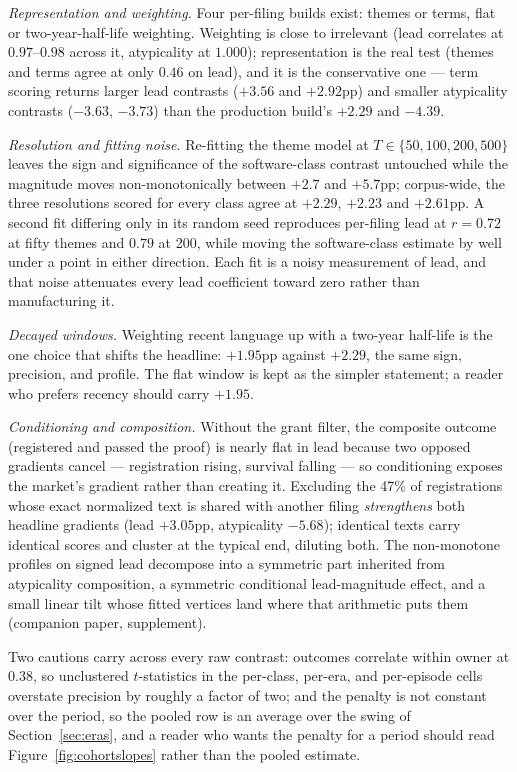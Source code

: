 \emph{Representation and weighting.} Four per-filing builds exist: themes
or terms, flat or two-year-half-life weighting. Weighting is close to
irrelevant (lead correlates at $0.97$--$0.98$ across it, atypicality at
$1.000$); representation is the real test (themes and terms agree at only
$0.46$ on lead), and it is the conservative one --- term scoring returns
larger lead contrasts ($+3.56$ and $+2.92$pp) and smaller atypicality
contrasts ($-3.63$, $-3.73$) than the production build's $+2.29$ and
$-4.39$.

\emph{Resolution and fitting noise.} Re-fitting the theme model at
$T \in \{50, 100, 200, 500\}$ leaves the sign and significance of the
software-class contrast untouched while the magnitude moves
non-monotonically between $+2.7$ and $+5.7$pp; corpus-wide, the three
resolutions scored for every class agree at $+2.29$, $+2.23$ and
$+2.61$pp. A second fit differing only in its random seed reproduces
per-filing lead at $r = 0.72$ at fifty themes and $0.79$ at 200, while
moving the software-class estimate by well under a point in either
direction. Each fit is a noisy measurement of lead, and that noise
attenuates every lead coefficient toward zero rather than manufacturing
it.

\emph{Decayed windows.} Weighting recent language up with a two-year
half-life is the one choice that shifts the headline: $+1.95$pp against
$+2.29$, the same sign, precision, and profile. The flat window is kept
as the simpler statement; a reader who prefers recency should carry
$+1.95$.

\emph{Conditioning and composition.}\label{sec:robust_uncond} Without the
grant filter, the composite outcome (registered and passed the proof) is
nearly flat in lead because two opposed gradients cancel --- registration
rising, survival falling --- so conditioning exposes the market's
gradient rather than creating it. Excluding the 47\% of registrations
whose exact normalized text is shared with another filing
\emph{strengthens} both headline gradients (lead $+3.05$pp, atypicality
$-5.68$); identical texts carry identical scores and cluster at the
typical end, diluting both. The non-monotone profiles on signed lead
decompose into a symmetric part inherited from atypicality composition, a
symmetric conditional lead-magnitude effect, and a small linear tilt
whose fitted vertices land where that arithmetic puts them (companion
paper, supplement).

Two cautions carry across every raw contrast: outcomes correlate within
owner at $0.38$, so unclustered $t$-statistics in the per-class, per-era,
and per-episode cells overstate precision by roughly a factor of two; and
the penalty is not constant over the period, so the pooled row is an
average over the swing of Section~\ref{sec:eras}, and a reader who wants
the penalty for a period should read Figure~\ref{fig:cohortslopes}
rather than the pooled estimate.
